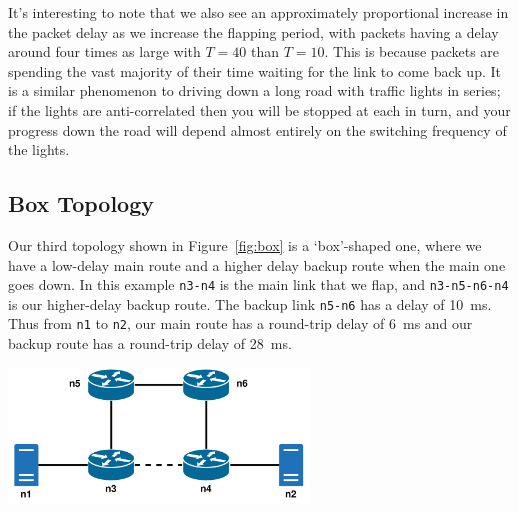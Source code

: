 \documentclass[withindex,glossary,openany]{cam-thesis}
\begin{document}
It's interesting to note that we also see an approximately proportional increase in the packet delay as we increase the flapping period, with packets having a delay around four times as large with $T=40$ than $T=10$. This is because packets are spending the vast majority of their time waiting for the link to come back up. It is a similar phenomenon to driving down a long road with traffic lights in series; if the lights are anti-correlated then you will be stopped at each in turn, and your progress down the road will depend almost entirely on the switching frequency of the lights.


\subsection{Box Topology}

Our third topology shown in Figure~\ref{fig:box} is a `box'-shaped one, where we have a low-delay main route and a higher delay backup route when the main one goes down. In this example \texttt{n3-n4} is the main link that we flap, and \texttt{n3-n5-n6-n4} is our higher-delay backup route. The backup link \texttt{n5-n6} has a delay of \SI{10}{\ms}. Thus from \texttt{n1} to \texttt{n2}, our main route has a round-trip delay of \SI{6}{\ms} and our backup route has a round-trip delay of \SI{28}{\ms}.

\begin{minipage}{1\textwidth} \centering
	\includegraphics[width=0.6\textwidth]{delay_box_topology}
\end{minipage}
\end{document}

